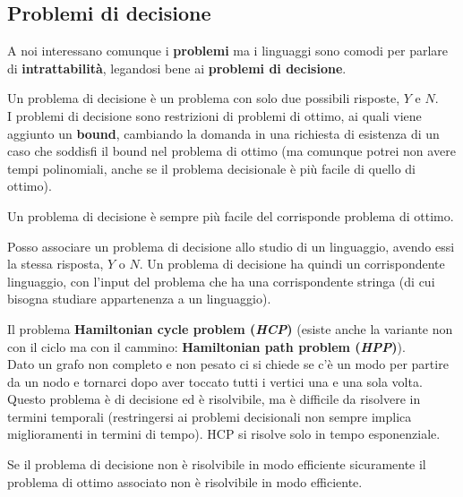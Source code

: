 \subsection{Problemi di decisione}
A noi interessano comunque i \textbf{problemi} ma i linguaggi sono comodi per
parlare di \textbf{intrattabilità}, legandosi bene ai \textbf{problemi di
  decisione}.
\begin{definizione}
  Un problema di decisione è un problema con solo due possibili risposte, $Y$ e
  $N$.\\
  I problemi di decisione sono restrizioni di problemi di ottimo, ai quali viene
  aggiunto un \textbf{bound}, cambiando la domanda in una richiesta di esistenza
  di un caso che soddisfi il bound nel problema di ottimo (ma comunque potrei
  non avere tempi polinomiali, anche se il problema decisionale è più facile di
  quello di ottimo).
\end{definizione}
\begin{teorema}
  Un problema di decisione è sempre più facile del corrisponde problema di
  ottimo.
\end{teorema}
Posso associare un problema di decisione allo studio di un linguaggio, avendo
essi la stessa risposta, $Y$ o $N$. Un problema di decisione ha quindi un
corrispondente linguaggio, con l'input del problema che ha una corrispondente
stringa (di cui bisogna studiare appartenenza a un linguaggio).\\
\begin{esempio}
  Il problema \textbf{Hamiltonian cycle problem (\textit{HCP})} (esiste anche la
  variante non con il ciclo ma con il cammino: \textbf{Hamiltonian path problem
    (\textit{HPP})}).\\ 
  Dato un grafo non completo e non pesato ci si chiede se c'è un modo per
  partire da un nodo e tornarci dopo aver toccato tutti i vertici una e una sola
  volta.\\
  Questo problema è di decisione ed è risolvibile, ma è difficile da risolvere
  in termini temporali (restringersi ai problemi decisionali non sempre implica
  miglioramenti in termini di tempo). HCP si risolve solo in tempo esponenziale.
\end{esempio}
\begin{teorema}
  Se il problema di decisione non è risolvibile in modo efficiente sicuramente
  il problema di ottimo associato non è risolvibile in modo efficiente.
\end{teorema}
